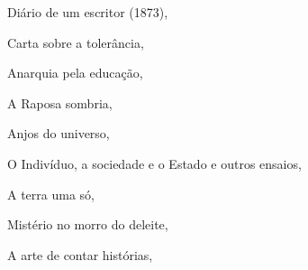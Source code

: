 \begin{multicols}{2}
\begin{enumerate}
{\item Diário de um escritor (1873), {}
\item Carta sobre a tolerância, {}
\item Anarquia pela educação, {}
\item A Raposa sombria, {}
\item Anjos do universo, {}
\item O Indivíduo, a sociedade e o Estado e outros ensaios, {}
\item A terra uma só, {}
\item Mistério no morro do deleite, {}
\item A arte de contar histórias, {}
}
\end{enumerate}
\end{multicols}

\pagebreak
